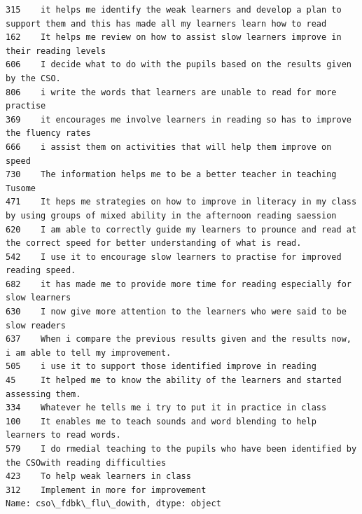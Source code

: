 \documentclass[11pt]{article}
\begin{document}
    \begin{Verbatim}[commandchars=\\\{\}]
315    it helps me identify the weak learners and develop a plan to support them and this has made all my learners learn how to read     
162    It helps me review on how to assist slow learners improve in their reading levels                                                 
606    I decide what to do with the pupils based on the results given by the CSO.                                                        
806    i write the words that learners are unable to read for more practise                                                              
369    it encourages me involve learners in reading so has to improve the fluency rates                                                  
666    i assist them on activities that will help them improve on speed                                                                  
730    The information helps me to be a better teacher in teaching Tusome                                                                
471    It heps me strategies on how to improve in literacy in my class by using groups of mixed ability in the afternoon reading saession
620    I am able to correctly guide my learners to prounce and read at the correct speed for better understanding of what is read.       
542    I use it to encourage slow learners to practise for improved reading speed.                                                       
682    it has made me to provide more time for reading especially for slow learners                                                      
630    I now give more attention to the learners who were said to be slow readers                                                        
637    When i compare the previous results given and the results now, i am able to tell my improvement.                                  
505    i use it to support those identified improve in reading                                                                           
45     It helped me to know the ability of the learners and started assessing them.                                                      
334    Whatever he tells me i try to put it in practice in class                                                                         
100    It enables me to teach sounds and word blending to help learners to read words.                                                   
579    I do rmedial teaching to the pupils who have been identified by the CSOwith reading difficulties                                  
423    To help weak learners in class                                                                                                    
312    Implement in more for improvement                                                                                                 
Name: cso\_fdbk\_flu\_dowith, dtype: object

    \end{Verbatim}
\end{document}
